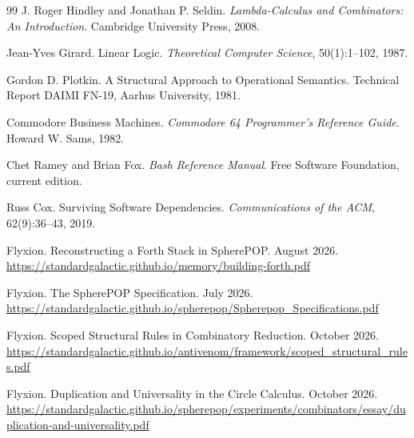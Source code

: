 \documentclass[11pt,oneside]{report}
\theoremstyle{plain}
\theoremstyle{definition}
\theoremstyle{remark}
\begin{document}
\begin{thebibliography}{99}
 J. Roger Hindley and Jonathan P. Seldin. \emph{Lambda-Calculus and Combinators: An Introduction}. Cambridge University Press, 2008.

 Jean-Yves Girard. Linear Logic. \emph{Theoretical Computer Science}, 50(1):1--102, 1987.

 Gordon D. Plotkin. A Structural Approach to Operational Semantics. Technical Report DAIMI FN-19, Aarhus University, 1981.

 Commodore Business Machines. \emph{Commodore 64 Programmer's Reference Guide}. Howard W. Sams, 1982.

 Chet Ramey and Brian Fox. \emph{Bash Reference Manual}. Free Software Foundation, current edition.

 Russ Cox. Surviving Software Dependencies. \emph{Communications of the ACM}, 62(9):36--43, 2019.

 Flyxion. Reconstructing a Forth Stack in SpherePOP. August 2026. \url{https://standardgalactic.github.io/memory/building-forth.pdf}

 Flyxion. The SpherePOP Specification. July 2026. \url{https://standardgalactic.github.io/spherepop/Spherepop_Specifications.pdf}

 Flyxion. Scoped Structural Rules in Combinatory Reduction. October 2026. \url{https://standardgalactic.github.io/antivenom/framework/scoped_structural_rules.pdf}

 Flyxion. Duplication and Universality in the Circle Calculus. October 2026. \url{https://standardgalactic.github.io/spherepop/experiments/combinators/essay/duplication-and-universality.pdf}

\end{thebibliography}
\end{document}

